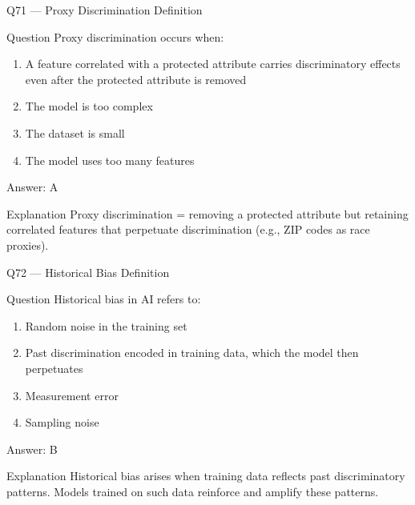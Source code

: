 \documentclass[aspectratio=169,8pt]{beamer}
\begin{document}
	\begin{frame}{Q71 --- Proxy Discrimination Definition}
		\begin{block}{Question}
			Proxy discrimination occurs when:
			\begin{enumerate}
				\item A feature correlated with a protected attribute carries discriminatory effects even after the protected attribute is removed
				\item The model is too complex
				\item The dataset is small
				\item The model uses too many features
			\end{enumerate}
		\end{block}
		\begin{exampleblock}{Answer: A}\end{exampleblock}
		\begin{block}{Explanation}
			Proxy discrimination = removing a protected attribute but retaining correlated features that perpetuate discrimination (e.g., ZIP codes as race proxies).
		\end{block}
	\end{frame}
	
	\begin{frame}{Q72 --- Historical Bias Definition}
		\begin{block}{Question}
			Historical bias in AI refers to:
			\begin{enumerate}
				\item Random noise in the training set
				\item Past discrimination encoded in training data, which the model then perpetuates
				\item Measurement error
				\item Sampling noise
			\end{enumerate}
		\end{block}
		\begin{exampleblock}{Answer: B}\end{exampleblock}
		\begin{block}{Explanation}
			Historical bias arises when training data reflects past discriminatory patterns. Models trained on such data reinforce and amplify these patterns.
		\end{block}
	\end{frame}
	
\end{document}
